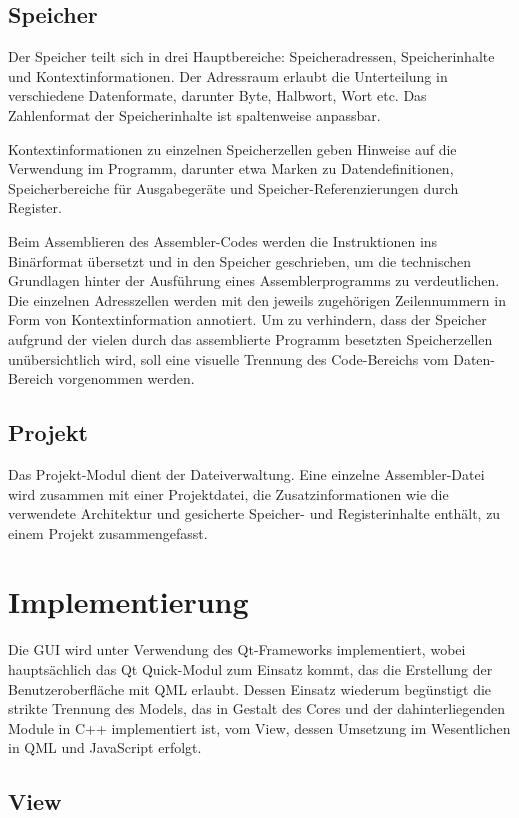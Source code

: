 \subsection{Speicher}

Der Speicher teilt sich in drei Hauptbereiche: Speicheradressen, Speicherinhalte und Kontextinformationen.
Der Adressraum erlaubt die Unterteilung in verschiedene Datenformate, darunter Byte, Halbwort, Wort etc.
Das Zahlenformat der Speicherinhalte ist spaltenweise anpassbar.

Kontextinformationen zu einzelnen Speicherzellen geben Hinweise auf die Verwendung im Programm, darunter etwa Marken zu Datendefinitionen, Speicherbereiche für Ausgabegeräte und Speicher-Referenzierungen durch Register.

Beim Assemblieren des Assembler-Codes werden die Instruktionen ins Binärformat übersetzt und in den Speicher geschrieben, um die technischen Grundlagen hinter der Ausführung eines Assemblerprogramms zu verdeutlichen. Die einzelnen Adresszellen werden mit den jeweils zugehörigen Zeilennummern in Form von Kontextinformation annotiert. Um zu verhindern, dass der Speicher aufgrund der vielen durch das assemblierte Programm besetzten Speicherzellen unübersichtlich wird, soll eine visuelle Trennung des Code-Bereichs vom Daten-Bereich vorgenommen werden.

\subsection{Projekt}

Das Projekt-Modul dient der Dateiverwaltung. Eine einzelne Assembler-Datei wird zusammen mit einer Projektdatei, die Zusatzinformationen wie die verwendete Architektur und gesicherte Speicher- und Registerinhalte enthält, zu einem Projekt zusammengefasst.

\section{Implementierung}

Die GUI wird unter Verwendung des Qt-Frameworks implementiert, wobei hauptsächlich das Qt Quick-Modul zum Einsatz kommt, das die Erstellung der Benutzeroberfläche mit QML erlaubt. Dessen Einsatz wiederum begünstigt die strikte Trennung des Models, das in Gestalt des Cores und der dahinterliegenden Module in C++ implementiert ist, vom View, dessen Umsetzung im Wesentlichen in QML und JavaScript erfolgt.

\subsection{View}

